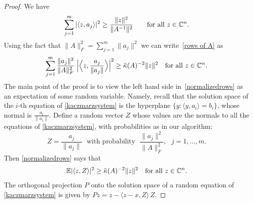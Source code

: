 \begin{proof}
We have
\begin{equation}
\sum_{j=1}^m |\langle z, a_j \rangle |^2 \ge  \frac{\|z\|^2}{\|A^{-1}\|^2}
 \qquad \text{for all $z \in \mathbb{C}^n$.}        \label{rows of A}
\end{equation}
Using the fact that $\|A\|_F^2=\sum_{j=1}^m \|a_j\|^2$ we can
write~\eqref{rows of A} as
\begin{equation} 
\label{normalizedrows}
\sum_{j=1}^m \frac{\|a_j\|^2}{\|A\|_F^2} \;
  \Bigl| \Big\langle z, \frac{a_j}{\|a_j\|} \Big\rangle \Big|^2
\ge \tilde{\kappa}(A)^{-2} \|z\|^2
 \ \ \ \text{for all $z \in \mathbb{C}^n$}.
\end{equation}
The main point of the proof is to view the left hand side
in~\eqref{normalizedrows} as an expectation of some random variable.
Namely, recall that the solution space of the $i$-th equation of \eqref{kaczmarzsystem}
is the hyperplane $\{y : \langle y, a_i \rangle = b_i \}$, whose normal is
$\frac{a_i}{\|a_i\|}$.
Define a random vector $Z$ whose values are the normals to all
the equations of \eqref{kaczmarzsystem}, with probabilities as in our algorithm:
\begin{equation}                    \label{Z}
Z  =  \frac{a_j}{\|a_j\|}
\ \ \ \text{with probability} \ \ \
\frac{\|a_j\|^2}{\|A\|_F^2}, \ \ \
j = 1, \ldots, m.
\end{equation}
Then \eqref{normalizedrows} says that
\begin{equation}                    \label{expectation}
\mathbb{E} | \langle z, Z\rangle |^2  \ge \tilde{\kappa}(A)^{-2} \|z\|^2
 \ \ \ \text{for all $z \in \mathbb{C}^n$.}
\end{equation}
The orthogonal projection $P$ onto the solution space of a random
equation of \eqref{kaczmarzsystem} is given by
$P z = z - \langle z - x, Z \rangle \, Z$.



\end{proof}
